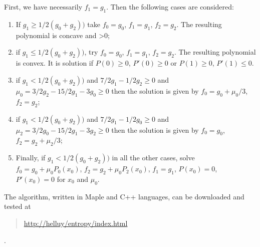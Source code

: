 \documentclass{fldauth}
\theoremstyle{plain}
\theoremstyle{plain}
\theoremstyle{plain}
\theoremstyle{plain}
\theoremstyle{plain}
\theoremstyle{plain}
\begin{document}
First, we have necessarily $f_1=g_1$. Then the following cases are
considered:
\begin{enumerate}
    \item If $g_1 \geq 1/2(g_0+g_2))$ take $f_0=g_0$, $f_1=g_1$, $f_2=g_2$. The
    resulting polynomial is concave and >0;
    \item if $g_1 \leq 1/2(g_0+g_2))$, try $f_0=g_0$, $f_1=g_1$,
    $f_2=g_2$. The resulting polynomial is convex. It is solution
    if $P(0)\geq 0$, $P'(0)\geq 0$ or $P(1)\geq 0$, $P'(1)\leq 0$.
    \item if $g_1 < 1/2(g_0+g_2))$ and $7/2g_1-1/2g_2\geq 0$ and
    $\mu_0=3/2g_2-15/2g_1-3g_0 \geq0$ then the solution is given
    by $f_0=g_0+\mu_0/3$, $f_2=g_2$;
    \item if $g_1 < 1/2(g_0+g_2))$ and $7/2g_1-1/2g_0\geq 0$ and
    $\mu_2=3/2g_0-15/2g_1-3g_2 \geq0$ then the solution is given
    by $f_0=g_0$, $f_2=g_2+\mu_2/3$;
    \item Finally, if $g_1 < 1/2(g_0+g_2))$ in all the other
    cases, solve $f_0=g_0+\mu_0 P_0(x_0)$, $f_2=g_2+\mu_0 P_2(x_0)$,
    $f_1=g_1$,
    $P(x_0)=0$, $P'(x_0)=0$ for $x_0$ and $\mu_0$.
\end{enumerate}
The algorithm, written in Maple and C++ languages, can be
downloaded and tested at
\begin{quote}\url{http://helluy/entropy/index.html}\end{quote}.

\end{document}
